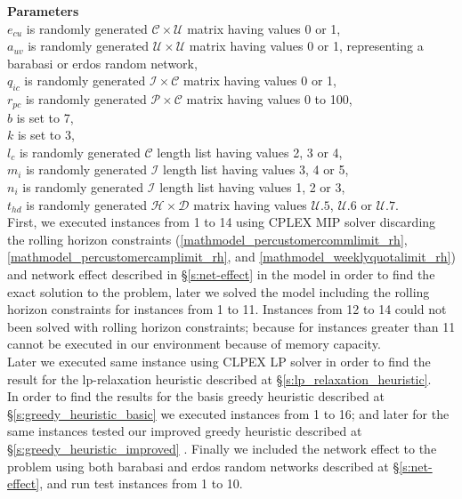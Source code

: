 \documentclass[11pt]{article}
\begin{document}
\noindent \textbf{Parameters}\\

\noindent $e_{{c}{u}}$ is randomly generated $\mathcal{C} \times \mathcal{U}$ matrix having values 0 or 1,\\
\noindent $a_{{u}{v}}$ is randomly generated $\mathcal{U} \times \mathcal{U}$ matrix having values 0 or 1, representing a barabasi or erdos random network,\\
\noindent $q_{{i}{c}}$ is randomly generated $\mathcal{I} \times \mathcal{C}$ matrix having values 0 or 1,\\
\noindent $r_{{p}{c}}$ is randomly generated $\mathcal{P} \times \mathcal{C}$ matrix having values 0 to 100,\\
\noindent $b$ is set to 7,\\
\noindent $k$ is set to 3,\\
\noindent $l_c$ is randomly generated $\mathcal{C}$ length list having values 2, 3 or 4,\\
\noindent $m_i$ is randomly generated $\mathcal{I}$ length list having values 3, 4 or 5,\\
\noindent $n_i$ is randomly generated $\mathcal{I}$ length list having values 1, 2 or 3,\\
\noindent $t_{{h}{d}}$ is randomly generated $\mathcal{H} \times \mathcal{D}$ matrix having values $\mathcal{U}.5$, $\mathcal{U}.6$ or $\mathcal{U}.7$.\\

First, we executed instances from 1 to 14 using CPLEX MIP solver discarding the rolling horizon constraints (\ref{mathmodel_percustomercommlimit_rh}, \ref{mathmodel_percustomercamplimit_rh},  and \ref{mathmodel_weeklyquotalimit_rh}) and network effect described in \S \ref{s:net-effect} in the model in order to find the exact solution to the problem, later we solved the model including the rolling horizon constraints for instances from 1 to 11. Instances from 12 to 14 could not been solved with rolling horizon constraints; because for instances greater than 11 cannot be executed in our environment because of memory capacity.\\
Later we executed same instance using CLPEX LP solver in order to find the result for the lp-relaxation heuristic described at \S \ref{s:lp_relaxation_heuristic}.\\
In order to find the results for the basis greedy heuristic described at \S \ref{s:greedy_heuristic_basic} we executed instances from 1 to 16; and later for the same instances tested our improved greedy heuristic described at \S \ref{s:greedy_heuristic_improved} .
Finally we included the network effect to the problem using both barabasi and erdos random networks described at \S \ref{s:net-effect}, and run test instances from 1 to 10.
\end{document}
